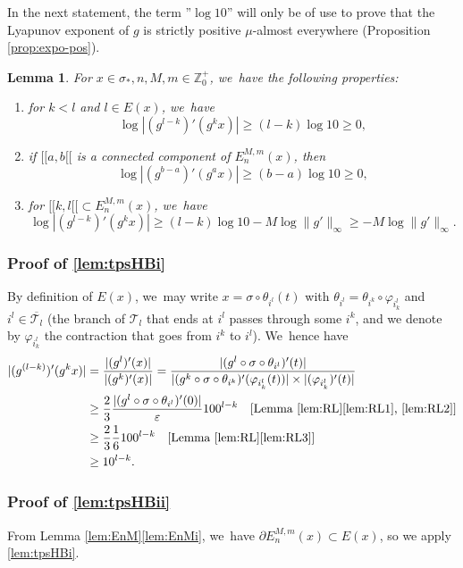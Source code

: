 \documentclass[10pt]{amsart}
\newenvironment{enumeratei}
{\bgroup\def\theenumi{\roman{enumi}}\def\theenumii{\arabic{enumii}}\begin{enumerate}}
{\end{enumerate}\egroup}
\newtheorem{lem}[thm]{Lemma}
\theoremstyle{definition}
\newcommand{\bbZ}{{\mathbb{Z}}}
\begin{document}
In the next statement, the term ''$\log 10$'' will only be of use to prove that the Lyapunov exponent of $g$ is strictly positive $\mu$-almost everywhere (Proposition \ref{prop:expo-pos}).

\pagebreak[2]
\begin{lem}
\label{lem:tpsHB}
For $x \in \sigma_*, n, M,m \in \bbZ_0^+$, we~have the following properties:
\begin{enumeratei}
\item\label{lem:tpsHBi}
 for $k < l$ and $l \in E(x)$, we~have
\[
\log |(g^{l-k})'(g^k x)| \geq (l-k) \log 10 \geq 0,
\]
\item\label{lem:tpsHBii}
 if $[\![ a, b [\![$ is a connected component of $E_n^{M,m}(x)$, then
\[
\log |(g^{b-a})'(g^a x)| \geq (b-a) \log 10 \geq 0,
\]
\item\label{lem:tpsHBiii}
 for $[\![ k, l [\![ \subset E_n^{M,m}(x)$, we~have
\[
\log |(g^{l-k})'(g^k x)| \geq (l-k) \log 10 - M \log \| g' \|_{\infty} \geq - M \log \| g' \|_{\infty}.
\]
\end{enumeratei}
\end{lem}

\subsubsection*{Proof of \eqref{lem:tpsHBi}}
By definition of $E(x)$, we~may write $x = \sigma \circ \theta_{i^l}(t)$ with $\theta_{i^l} = \theta_{i^k} \circ \varphi_{i_k^l}$ and $i^l \in \overline{\mathcal{T}_l}$ (\ie the branch of $\mathcal{T}_l$ that ends at $i^l$ passes through some $i^k$, and we denote by $\varphi_{i_k^l}$ the contraction that goes from $i^k$ to $i^l$). We~hence have
\begin{align*}
|(g^{(l-k)})'(g^k x) | &= \frac{| (g^l)'(x) |}{| (g^k)'(x) |} = \frac{| (g^l \circ \sigma \circ \theta_{i^l})'(t) |}{| (g^k \circ \sigma \circ \theta_{i^k})'(\varphi_{i_k^l}(t)) | \times | (\varphi_{i_k^l})'(t) |}\\
&\geq \frac{2}{3} \frac{| (g^l \circ \sigma \circ \theta_{i^l})'(0) |}{\varepsilon} 100^{l-k}\quad[\text{Lemma~\ref{lem:RL}\eqref{lem:RL1}, \eqref{lem:RL2}}]\\
&\geq \frac{2}{3} \frac{1}{6} 100^{l-k}\quad[\text{Lemma~\ref{lem:RL}\eqref{lem:RL3}}]\\
&\geq 10^{l-k}.
\end{align*}

\subsubsection*{Proof of \eqref{lem:tpsHBii}}
From Lemma \ref{lem:EnM}\eqref{lem:EnMi}, we~have $\partial E_n^{M,m}(x) \subset E(x)$, so we apply \eqref{lem:tpsHBi}.
\end{document}
